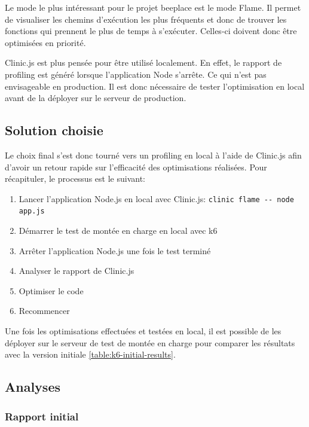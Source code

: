 Le mode le plus intéressant pour le projet \gls{beeplace} est le mode Flame. Il permet de visualiser les chemins d'exécution les plus fréquents et donc de trouver les fonctions qui prennent le plus de temps à s'exécuter. Celles-ci doivent donc être optimisées en priorité.

Clinic.js est plus pensée pour être utilisé localement. En effet, le rapport de profiling est généré lorsque l'application Node s'arrête. Ce qui n'est pas envisageable en production. Il est donc nécessaire de tester l'optimisation en local avant de la déployer sur le serveur de production.

\subsection{Solution choisie}

Le choix final s'est donc tourné vers un profiling en local à l'aide de Clinic.js afin d'avoir un retour rapide sur l'efficacité des optimisations réalisées. Pour récapituler, le processus est le suivant:

\begin{enumerate}
  \item Lancer l'application Node.js en local avec Clinic.js: \texttt{clinic flame -{}- node app.js}
  \item Démarrer le test de montée en charge en local avec k6
  \item Arrêter l'application Node.js une fois le test terminé
  \item Analyser le rapport de Clinic.js
  \item Optimiser le code
  \item Recommencer
\end{enumerate}

Une fois les optimisations effectuées et testées en local, il est possible de les déployer sur le serveur de test de montée en charge pour comparer les résultats avec la version initiale \ref{table:k6-initial-results}.

\subsection{Analyses}

\subsubsection{Rapport initial}


